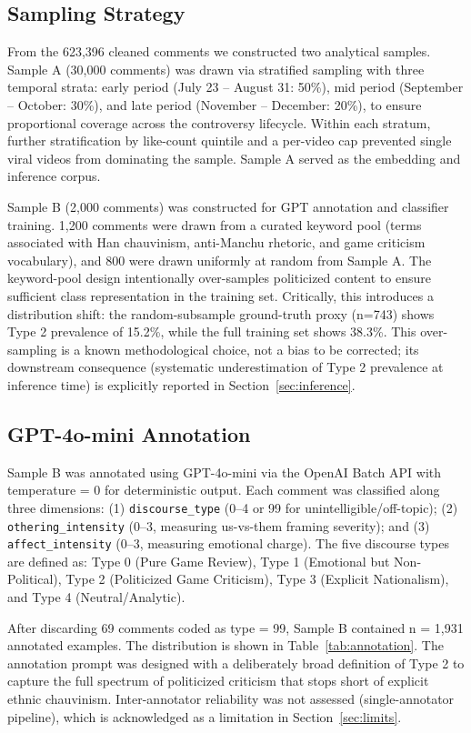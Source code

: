 \documentclass[letterpaper]{article}
\begin{document}
\subsection{Sampling Strategy}
From the 623,396 cleaned comments we constructed two analytical samples. Sample A (30,000 comments) was drawn via stratified sampling with three temporal strata: early period (July 23 -- August 31: 50\%), mid period (September -- October: 30\%), and late period (November -- December: 20\%), to ensure proportional coverage across the controversy lifecycle. Within each stratum, further stratification by like-count quintile and a per-video cap prevented single viral videos from dominating the sample. Sample A served as the embedding and inference corpus.

Sample B (2,000 comments) was constructed for GPT annotation and classifier training. 1,200 comments were drawn from a curated keyword pool (terms associated with Han chauvinism, anti-Manchu rhetoric, and game criticism vocabulary), and 800 were drawn uniformly at random from Sample A. The keyword-pool design intentionally over-samples politicized content to ensure sufficient class representation in the training set. Critically, this introduces a distribution shift: the random-subsample ground-truth proxy (n=743) shows Type 2 prevalence of 15.2\%, while the full training set shows 38.3\%. This over-sampling is a known methodological choice, not a bias to be corrected; its downstream consequence (systematic underestimation of Type 2 prevalence at inference time) is explicitly reported in Section~\ref{sec:inference}.

\subsection{GPT-4o-mini Annotation}
Sample B was annotated using GPT-4o-mini via the OpenAI Batch API with temperature = 0 for deterministic output. Each comment was classified along three dimensions: (1) \texttt{discourse\_type} (0--4 or 99 for unintelligible/off-topic); (2) \texttt{othering\_intensity} (0--3, measuring us-vs-them framing severity); and (3) \texttt{affect\_intensity} (0--3, measuring emotional charge). The five discourse types are defined as: Type 0 (Pure Game Review), Type 1 (Emotional but Non-Political), Type 2 (Politicized Game Criticism), Type 3 (Explicit Nationalism), and Type 4 (Neutral/Analytic).

After discarding 69 comments coded as type = 99, Sample B contained n = 1,931 annotated examples. The distribution is shown in Table~\ref{tab:annotation}. The annotation prompt was designed with a deliberately broad definition of Type 2 to capture the full spectrum of politicized criticism that stops short of explicit ethnic chauvinism. Inter-annotator reliability was not assessed (single-annotator pipeline), which is acknowledged as a limitation in Section~\ref{sec:limits}.
\end{document}
